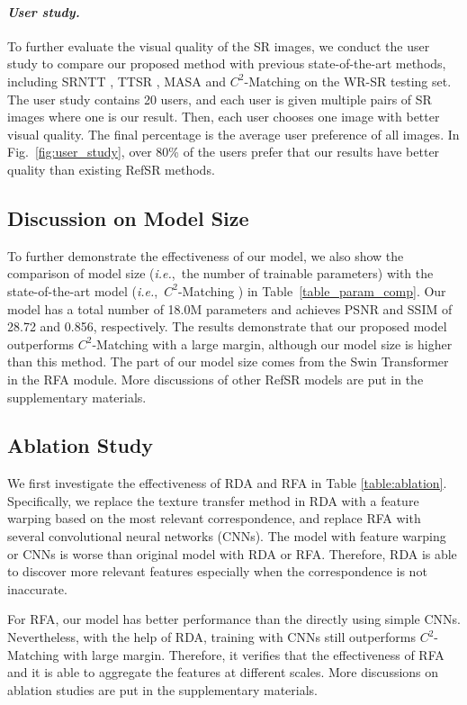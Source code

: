 \documentclass[runningheads]{llncs}
\def\ie{\mbox{\textit{i.e.}, }}
\begin{document}
\paragraph{\textbf{\emph{User study.}}}
To further evaluate the visual quality of the SR images, we conduct the user study to compare our proposed method with previous state-of-the-art methods, including SRNTT \cite{zhang2019image}, TTSR \cite{yang2020learning}, MASA \cite{lu2021masa} and $C^2$-Matching \cite{jiang2021robust} on the WR-SR testing set.
The user study contains 20 users, and each user is given multiple pairs of SR images where one is our result.
Then, each user chooses one image with better visual quality.
The final percentage is the average user preference of all images.
In Fig.~\ref{fig:user_study}, over 80\% of the users prefer that our results have better quality than existing RefSR methods.


\subsection{Discussion on Model Size}
To further demonstrate the effectiveness of our model, we also show the comparison of model size (\ie the number of trainable parameters) with the state-of-the-art model (\ie $C^2$-Matching \cite{jiang2021robust}) in Table~\ref{table_param_comp}.
Our model has a total number of 18.0M parameters and achieves PSNR and SSIM of 28.72 and 0.856, respectively.
The results demonstrate that our proposed model outperforms $C^2$-Matching with a large margin, although our model size is higher than this method.
The part of our model size comes from the Swin Transformer in the RFA module.
More discussions of other RefSR models are put in the supplementary materials.


\subsection{Ablation Study}

We first investigate the effectiveness of RDA and RFA in Table \ref{table:ablation}.
Specifically, we replace the texture transfer method in RDA with a feature warping based on the most relevant correspondence, and replace RFA with several convolutional neural networks (CNNs).
The model with feature warping or CNNs is worse than original model with RDA or RFA.
Therefore, RDA is able to discover more relevant features especially when the correspondence is not inaccurate. 

For RFA, our model has better performance than the directly using simple CNNs.
Nevertheless, with the help of RDA, training with CNNs still outperforms $C^2$-Matching with large margin. 
Therefore, it verifies that the effectiveness of RFA and it is able to aggregate the features at different scales. 
More discussions on ablation studies are put in the supplementary materials.
\end{document}
